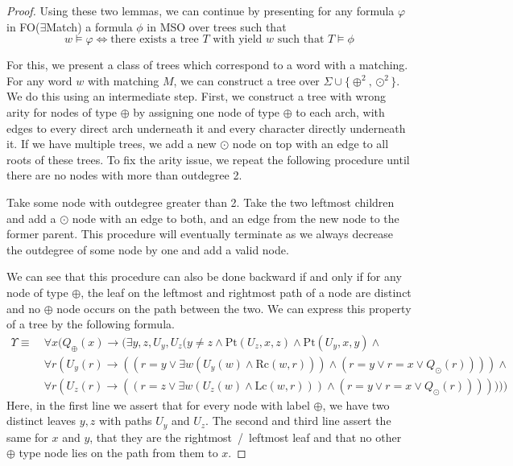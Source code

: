 \begin{proof}
    Using these two lemmas, we can continue by presenting for any formula $\varphi$ in \acs{FO}($\exists$Match) a formula $\phi$ in \acs{MSO} over trees such that
    \[w \models \varphi \Leftrightarrow \text{there exists a tree $T$ with yield $w$ such that } T \models \phi\]

    For this, we present a class of trees which correspond to a word with a matching.
    For any word $w$ with matching $M$, we can construct a tree over $\Sigma \cup \{\oplus^2, \odot^2\}$.
    We do this using an intermediate step.
    First, we construct a tree with wrong arity for nodes of type $\oplus$ by assigning one node of type $\oplus$ to each arch, with edges to every direct arch underneath it and every character directly underneath it.
    If we have multiple trees, we add a new $\odot$ node on top with an edge to all roots of these trees.
    To fix the arity issue, we repeat the following procedure until there are no nodes with more than outdegree 2.

    Take some node with outdegree greater than 2.
    Take the two leftmost children and add a $\odot$ node with an edge to both, and an edge from the new node to the former parent.
    This procedure will eventually terminate as we always decrease the outdegree of some node by one and add a valid node.

    We can see that this procedure can also be done backward if and only if for any node of type $\oplus$, the leaf on the leftmost and rightmost path of a node are distinct and no $\oplus$ node occurs on the path between the two.
    We can express this property of a tree by the following formula.
    \begin{align*}
        \Upsilon \equiv~& \forall x ( Q_{\oplus}(x) \to ( \exists y, z, U_y, U_z (y \neq z \land \text{Pt}(U_z, x, z) \land \text{Pt}(U_y, x, y) \land \\
        &\forall r (U_y(r) \to ((r = y \lor \exists w (U_y(w) \land \text{Rc}(w, r)))\land (r = y \lor r = x \lor Q_{\odot}(r)))) \land \\
        &\forall r (U_z(r) \to ((r = z \lor \exists w (U_z(w) \land \text{Lc}(w, r)))\land (r = y \lor r = x \lor Q_{\odot}(r)))))))
    \end{align*}
    Here, in the first line we assert that for every node with label $\oplus$, we have two distinct leaves $y, z$ with paths $U_y$ and $U_z$.
    The second and third line assert the same for $x$ and $y$, that they are the rightmost~/~leftmost leaf and that no other $\oplus$ type node lies on the path from them to $x$.


\end{proof}
